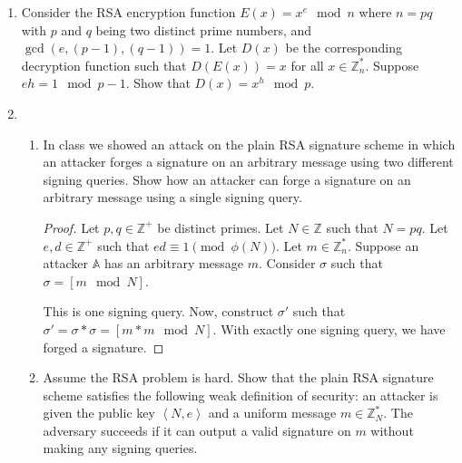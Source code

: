 \documentclass{article}
\begin{document}
\begin{enumerate}
  \item Consider the RSA encryption function $E(x) = x^e \mod n$ where $n = pq$
    with $p$ and $q$ being two distinct prime numbers, and $\gcd(e, (p - 1), (q
    - 1)) = 1$. Let $D(x)$ be the corresponding decryption function such that
    $D(E(x)) = x$ for all $x \in \mathbb{Z}^{*}_n$. Suppose $eh = 1 \mod p - 1$.
    Show that $D(x) = x^h \mod p$.
  \item
    \begin{enumerate}
      \item In class we showed an attack on the plain RSA signature scheme in
        which an attacker forges a signature on an arbitrary message using two
        different signing queries. Show how an attacker can forge a signature on
        an arbitrary message using a single signing query.

        \begin{proof}
          Let $p, q \in \mathbb{Z}^{+}$ be distinct primes. Let $N \in
          \mathbb{Z}$ such that $N = pq$. Let $e, d \in \mathbb{Z}^{+}$ such
          that $ed \equiv 1 \pmod{\phi(N)}$. Let $m \in \mathbb{Z}^{*}_n$.
          Suppose an attacker $\mathbb{A}$ has an arbitrary message $m$.
          Consider $\sigma$ such that $\sigma = \left[m \mod N\right]$.

          This is one signing query. Now, construct $\sigma'$ such that $\sigma'
          = \sigma * \sigma = \left[m * m \mod N\right]$. With exactly one
          signing query, we have forged a signature.
        \end{proof}
      \item Assume the RSA problem is hard. Show that the plain RSA signature
        scheme satisfies the following weak definition of security: an attacker
        is given the public key $\left<N, e\right>$ and a uniform message $m \in
        \mathbb{Z}^{*}_N$. The adversary succeeds if it can output a valid
        signature on $m$ without making any signing queries.


\end{enumerate}
\end{enumerate}
\end{document}
